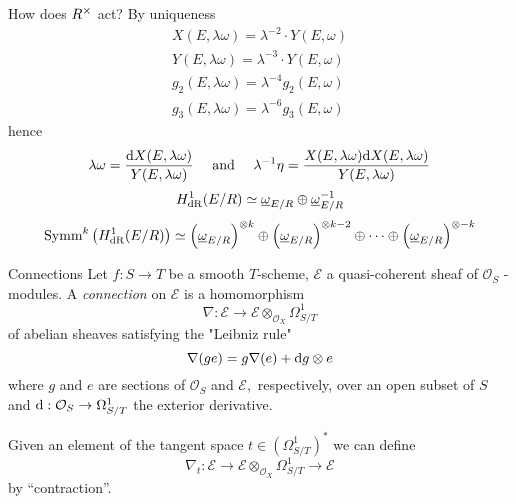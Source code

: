 \begin{frame}{How does $R^{\times}$ act?}
    By uniqueness
    \begin{equation*}
        \begin{array}{l}
            {X}\left({E}, \lambda{\omega}\right)=\lambda^{-2} \cdot {Y}({E}, \omega) \\
            {Y}({E}, \lambda \omega)=\lambda^{-3} \cdot {Y}({E}, \omega) \\
            {g}_{2}({E}, \lambda \omega)=\lambda^{-4} {g}_{2}({E}, \omega) \\
            {g}_{3}({E}, \lambda \omega)=\lambda^{-6} {g}_{3}({E}, \omega)
        \end{array}
    \end{equation*}\pause
    hence
    \begin{equation*}
        \lambda \omega=\frac{\mathop{}\!\mathrm{d} {X}({E}, \lambda \omega)}{{Y}({E}, \lambda \omega)} \quad \text { and } \quad \lambda^{-1} \eta=\frac{{X}({E}, \lambda \omega) {\mathop{}\!\mathrm{d}} {X}({E}, \lambda \omega)}{{Y}({E}, \lambda \omega)}
    \end{equation*}
    \begin{equation*}
        {H}_{\mathrm{dR}}^1{({E} / {R})} \simeq \underline{\omega}_{{E} / {R}} \oplus \underline{\omega}_{{E} / {R}}^{-1}
    \end{equation*}
    \begin{equation*}
        \text{Symm}^{{k}}\left({H}_{{\mathrm{dR}}}^{1}({E} / {R})\right) \simeq\left(\underline{\omega}_{{E} / {R}}\right)^{\otimes {k}} \oplus\left(\underline{\omega}_{{E} / {R}}\right)^{\otimes {k}-2} \oplus \cdots \oplus\left(\underline{\omega}_{{E} / {R}}\right)^{\otimes-{k}}
    \end{equation*}
\end{frame}

\begin{frame}{Connections}
    Let $f: S \rightarrow T$ be a smooth $T$-scheme, $\mathcal{E}$ a quasi-coherent sheaf of $\mathcal{O}_{S}$ -modules.
    A \emph{connection} on $\mathcal{E}$ is a homomorphism
    $$
    \nabla: \mathcal{E} \rightarrow \mathcal{E} \otimes_{\mathcal{O}_{X}} \Omega_{S / T}^{1}
    $$
    of abelian sheaves satisfying the "Leibniz rule"
    $$
    \nabla(g e)=g \nabla(e)+\mathop{}\!\mathrm{d} g \otimes e
    $$
    where $g$ and $e$ are sections of $\mathcal{O}_{S}$ and $\mathcal{E},$ respectively, over an open subset of $S$ and $\mathop{}\!\mathrm{d} : \mathcal{O}_{S} \rightarrow \Omega_{S / T}^{1}$ the exterior derivative.\pause

    Given an element of the tangent space $t \in (\Omega_{S/T}^1)^*$ we can define
    \[
        \nabla_t \colon \mathcal E \to \mathcal{E} \otimes_{\mathcal{O}_{X}} \Omega_{S / T}^{1}\to \mathcal E
    \]
    by ``contraction''.


\end{frame}

